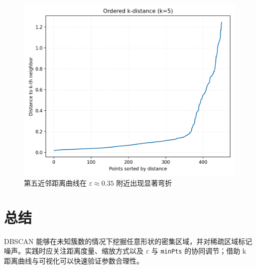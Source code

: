 \documentclass[UTF8,zihao=-4]{ctexart}
\begin{document}
\begin{figure}[H]
  \centering
  \includegraphics[width=0.82\linewidth]{dbscan_k_distance.png}
  \caption{第五近邻距离曲线在 \(\varepsilon\approx0.35\) 附近出现显著弯折}
  \label{fig:dbscan_k_distance_cn}
\end{figure}

\FloatBarrier
\section{总结}
DBSCAN 能够在未知簇数的情况下挖掘任意形状的密集区域，并对稀疏区域标记噪声。实践时应关注距离度量、缩放方式以及 \(\varepsilon\) 与 \texttt{minPts} 的协同调节；借助 k 距离曲线与可视化可以快速验证参数合理性。
\end{document}
